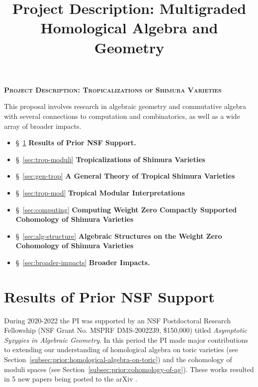\documentclass[11pt,reqno]{amsart}
\title{Project Description: Multigraded Homological Algebra and Geometry}
\theoremstyle{remark}
\begin{document}
 
\thispagestyle{empty}
\pagestyle{empty}
\begingroup  
  \centering
  \large\scshape\bfseries Project Description: Tropicalizations of Shimura Varieties\\[1em]
\endgroup


\setcounter{section}{0}

\noindent This proposal involves research in algebraic geometry and commutative algebra with several connections to computation and combinatorics, as well as a wide array of broader impacts.
\begin{itemize}[leftmargin=*]
	\item \S~\ref{sec:prior-work} \textbf{Results of Prior NSF Support.} 
	\item \S~\ref{sec:trop-moduli} \textbf{Tropicalizations of Shimura Varieties}
	\item \S~\ref{sec:gen-trop} \textbf{A General Theory of Tropical Shimura Varieties}
	\item \S~\ref{sec:trop-mod} \textbf{Tropical Modular Interpretations}
	\item \S~\ref{sec:computing} \textbf{Computing Weight Zero Compactly Supported Cohomology of Shimura Varieties}
	\item \S~\ref{sec:alg-structure} \textbf{Algebraic Structures on the Weight Zero Cohomology of Shimura Varieties}
	\item \S~\ref{sec:broader-impacts} \textbf{Broader Impacts.}
\end{itemize}

\section{Results of Prior NSF Support}\label{sec:prior-work}

During 2020-2022 the PI was supported by an NSF Postdoctoral Research Fellowship (NSF Grant No. MSPRF DMS-2002239, \$150,000) titled \textit{Asymptotic Syzygies in Algebraic Geometry}. In this period the PI made major contributions to extending our understanding of homological algebra on toric varieties (see Section~\ref{subsec:prior:homological-algebra-on-toric}) and the cohomology of moduli spaces (see Section~\ref{subsec:prior:cohomology-of-ag}). These works resulted in 5 new papers being posted to the arXiv \cite{BCEGLY22,bruceHellerSayrafi21,bruceHellerSayrafi22,brandtBruceCorey23,BBCMMW24}.
\end{document}
